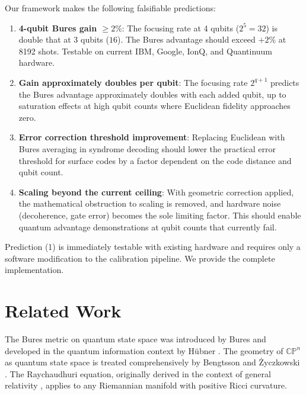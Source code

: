 \documentclass[12pt,a4paper]{article}
\begin{document}
Our framework makes the following falsifiable predictions:

\begin{enumerate}
    \item \textbf{4-qubit Bures gain $\geq 2\%$}: The focusing rate at 4 qubits ($2^5 = 32$) is double that at 3 qubits ($16$). The Bures advantage should exceed $+2\%$ at 8192 shots. Testable on current IBM, Google, IonQ, and Quantinuum hardware.

    \item \textbf{Gain approximately doubles per qubit}: The focusing rate $2^{q+1}$ predicts the Bures advantage approximately doubles with each added qubit, up to saturation effects at high qubit counts where Euclidean fidelity approaches zero.

    \item \textbf{Error correction threshold improvement}: Replacing Euclidean with Bures averaging in syndrome decoding should lower the practical error threshold for surface codes by a factor dependent on the code distance and qubit count.

    \item \textbf{Scaling beyond the current ceiling}: With geometric correction applied, the mathematical obstruction to scaling is removed, and hardware noise (decoherence, gate error) becomes the sole limiting factor. This should enable quantum advantage demonstrations at qubit counts that currently fail.
\end{enumerate}

Prediction (1) is immediately testable with existing hardware and requires only a software modification to the calibration pipeline. We provide the complete implementation.

\section{Related Work}
\label{sec:related}

The Bures metric on quantum state space was introduced by Bures \cite{bures1969} and developed in the quantum information context by H\"ubner \cite{hubner1992}. The geometry of $\mathbb{CP}^n$ as quantum state space is treated comprehensively by Bengtsson and \.Zyczkowski \cite{bengtsson2006}. The Raychaudhuri equation, originally derived in the context of general relativity \cite{raychaudhuri1955}, applies to any Riemannian manifold with positive Ricci curvature.
\end{document}
